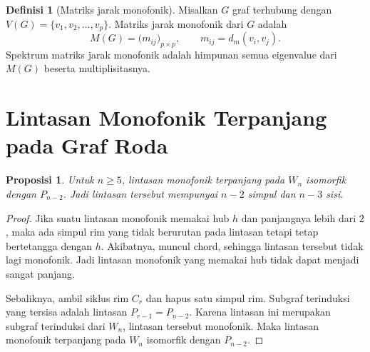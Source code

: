 \documentclass[12pt,a4paper]{article}
\newtheorem{proposisi}{Proposisi}
\theoremstyle{definition}
\newtheorem{definisi}{Definisi}
\begin{document}
\begin{definisi}[Matriks jarak monofonik]
  Misalkan $G$ graf terhubung dengan $V(G)=\{v_1,v_2,\ldots,v_p\}$. Matriks jarak monofonik dari $G$ adalah
  \[
    M(G)=\bigl(m_{ij}\bigr)_{p\times p},\qquad m_{ij}=d_m(v_i,v_j).
  \]
  Spektrum matriks jarak monofonik adalah himpunan semua eigenvalue dari $M(G)$ beserta multiplisitasnya.
\end{definisi}

\section{Lintasan Monofonik Terpanjang pada Graf Roda}

\begin{proposisi}
  Untuk $n\ge 5$, lintasan monofonik terpanjang pada $W_n$ isomorfik dengan $P_{n-2}$. Jadi lintasan tersebut mempunyai $n-2$ simpul dan $n-3$ sisi.
  \label{prop:longest-path}
\end{proposisi}

\begin{proof}
  Jika suatu lintasan monofonik memakai hub $h$ dan panjangnya lebih dari $2$, maka ada simpul rim yang tidak berurutan pada lintasan tetapi tetap bertetangga dengan $h$. Akibatnya, muncul chord, sehingga lintasan tersebut tidak lagi monofonik. Jadi lintasan monofonik yang memakai hub tidak dapat menjadi sangat panjang.

  Sebaliknya, ambil siklus rim $C_r$ dan hapus satu simpul rim. Subgraf terinduksi yang tersisa adalah lintasan $P_{r-1}=P_{n-2}$. Karena lintasan ini merupakan subgraf terinduksi dari $W_n$, lintasan tersebut monofonik. Maka lintasan monofonik terpanjang pada $W_n$ isomorfik dengan $P_{n-2}$.
\end{proof}
\end{document}
